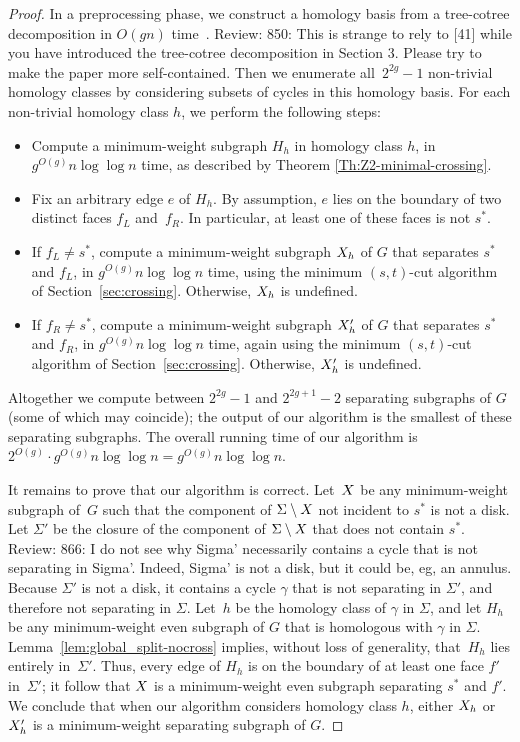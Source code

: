 \documentclass[letterpaper,review]{siamart190516}
\def\rnote#1{\color{red}Review: #1 \color{black}}
\begin{document}
{\begin{proof}
In a preprocessing phase, we  construct a homology basis from a tree-cotree decomposition in $O(gn)$ time~\cite{e-dgteg-03}.  
\rnote{
850: This is strange to rely to [41] while you have introduced the tree-cotree decomposition in Section 3. Please try to make the paper more self-contained. 
}
Then we enumerate all~$2^{2g}-1$ non-trivial homology classes by considering subsets of cycles in this homology basis.  For each non-trivial homology class $h$, we perform the following steps:
\begin{itemize}
\item
Compute a minimum-weight subgraph $H_h$ in homology class $h$, in $g^{O(g)}n\log\log n$ time, as described by Theorem \ref{Th:Z2-minimal-crossing}.
\item
Fix an arbitrary edge $e$ of $H_h$.  By assumption, $e$ lies on the boundary of two distinct faces
$f_L$ and~$f_R$.  In particular, at least one of these faces is not $s^*$.
\item
If $f_L\ne s^*$, compute a minimum-weight subgraph $X_h$ of $G$ that separates $s^*$ and $f_L$, in $g^{O(g)}n\log\log n$ time, using the minimum $(s,t)$-cut algorithm of Section~\ref{sec:crossing}.  Otherwise, $X_h$ is undefined.
\item
If $f_R\ne s^*$, compute a minimum-weight subgraph $X'_h$ of $G$ that separates $s^*$ and $f_R$, in $g^{O(g)}n\log\log n$ time, again using the minimum $(s,t)$-cut algorithm of Section~\ref{sec:crossing}.  Otherwise, $X'_h$ is undefined.
\end{itemize}
Altogether we compute between $2^{2g}-1$ and $2^{2g+1}-2$ separating subgraphs of $G$ (some of which may coincide); the output of our algorithm is the smallest of these separating subgraphs.  The overall running time of our algorithm is $2^{O(g)} \cdot g^{O(g)}n\log\log n = g^{O(g)}n\log\log n$.

It remains to prove that our algorithm is correct.  Let~$X$ be any minimum-weight subgraph
of~$G$ such that the component of $\Sigma \setminus X$ not incident to $s^*$ is not a disk.
Let $\Sigma'$ be the closure of the component of $\Sigma \setminus X$ that does not contain
$s^*$.  
\rnote{
866: I do not see why Sigma' necessarily contains a cycle that is not separating in Sigma'. Indeed, Sigma' is not a disk, but it could be, eg, an annulus. 
}
Because $\Sigma'$ is not a disk, it contains a cycle $\gamma$ that is not separating in
$\Sigma'$, and therefore not separating in $\Sigma$.  Let~$h$ be the homology class of $\gamma$ in
$\Sigma$, and let $H_h$ be any minimum-weight even subgraph of $G$ that is homologous with $\gamma$
in $\Sigma$.  Lemma~\ref{lem:global_split-nocross} implies, without loss of generality, that~$H_h$
lies entirely in~$\Sigma'$.  Thus, every edge of $H_h$ is on the boundary of at least one face $f'$
in~$\Sigma'$; it follow that $X$ is a minimum-weight even subgraph separating $s^*$ and $f'$.  We conclude that when our algorithm considers homology class $h$, either $X_h$ or $X'_h$ is a minimum-weight separating subgraph of $G$.
\end{proof}

}
\end{document}
